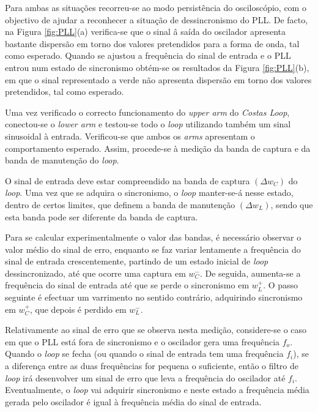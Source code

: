 \documentclass[11pt]{article}
\numberwithin{equation}{section}
\begin{document}
Para ambas as situações recorreu-se ao modo persistência do osciloscópio, com o objectivo de ajudar a reconhecer a situação de dessincronismo do PLL. De facto, na Figura \ref{fig:PLL}(a) verifica-se que o sinal â saída do oscilador apresenta bastante dispersão em torno dos valores pretendidos para a forma de onda, tal como esperado. Quando se ajustou a frequência do sinal de entrada e o PLL entrou num estado de sincronismo obtém-se os resultados da Figura \ref{fig:PLL}(b), em que o sinal representado a verde não apresenta dispersão em torno dos valores pretendidos, tal como esperado.

Uma vez verificado o correcto funcionamento do \textit{upper arm} do \textit{Costas Loop}, conectou-se o \textit{lower arm} e testou-se todo o \textit{loop} utilizando também um sinal sinusoidal à entrada. Verificou-se que ambos os \textit{arms} apresentam o comportamento esperado. Assim, procede-se à medição da banda de captura e da banda de manutenção do \textit{loop}.

O sinal de entrada deve estar compreendido na banda de captura $\left(\Delta w_{C}\right)$ do \textit{loop}. Uma vez que se adquira o sincronismo, o \textit{loop} manter-se-á nesse estado, dentro de certos limites, que definem a banda de manutenção $\left(\Delta w_{L}\right)$, sendo que esta banda pode ser diferente da banda de captura. 

Para se calcular experimentalmente o valor das bandas, é necessário observar o valor médio do sinal de erro, enquanto se faz variar lentamente a frequência do sinal de entrada crescentemente, partindo de um estado inicial de \textit{loop} dessincronizado, até que ocorre uma captura em $w_{C}^{-}$. De seguida, aumenta-se a frequência do sinal de entrada até que se perde o sincronismo em $w_{L}^{+}$. O passo seguinte é efectuar um varrimento no sentido contrário, adquirindo sincronismo em $w_{C}^{+}$, que depois é perdido em $w_{L}^{-}$.

Relativamente ao sinal de erro que se observa nesta medição, considere-se o caso em que o PLL está fora de sincronismo e o oscilador gera uma frequência $f_o$. Quando o \textit{loop} se fecha (ou quando o sinal de entrada tem uma frequência $f_i$), se a diferença entre as duas frequências for pequena o suficiente, então o filtro de  \textit{loop} irá desenvolver um sinal de erro que leva a frequência do oscilador até $f_i$. Eventualmente, o \textit{loop} vai adquirir sincronismo e neste estado a frequência média gerada pelo oscilador é igual à frequência média do sinal de entrada.
\end{document}
